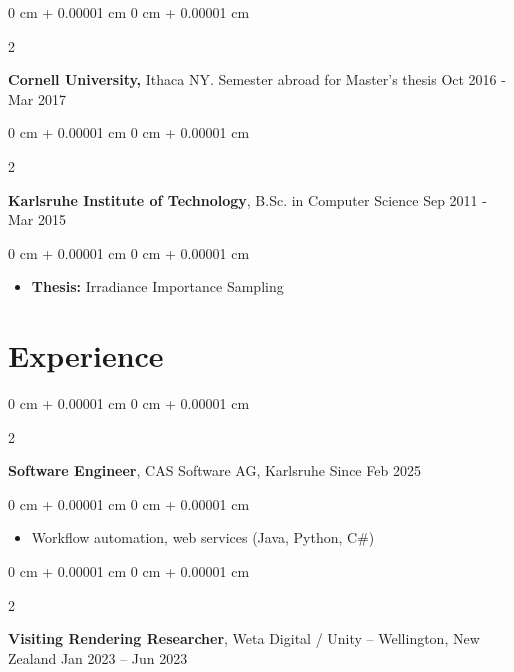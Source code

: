 \documentclass[10pt, letterpaper]{article}
\newenvironment{highlights}{
    \begin{itemize}[
        topsep=0.10 cm,
        parsep=0.10 cm,
        partopsep=0pt,
        itemsep=0pt,
        leftmargin=0 cm + 10pt
    ]
}{
    \end{itemize}
} %
\newenvironment{onecolentry}{
    \begin{adjustwidth}{
        0 cm + 0.00001 cm
    }{
        0 cm + 0.00001 cm
    }
}{
    \end{adjustwidth}
} %
\newenvironment{twocolentry}[2][]{
    \onecolentry
    \def\secondColumn{#2}
    \setcolumnwidth{\fill, 4.5 cm}
    \begin{paracol}{2}
}{
    \switchcolumn \raggedleft \secondColumn
    \end{paracol}
    \endonecolentry
} %
\begin{document}
        \educspace   
        
        \begin{twocolentry}{
            Oct 2016 - Mar 2017
        }
            \textbf{Cornell University,} Ithaca NY. Semester abroad for Master's thesis\end{twocolentry}

        \educspace

        \begin{twocolentry}{
            Sep 2011 - Mar 2015
        }
            \textbf{Karlsruhe Institute of Technology}, B.Sc. in Computer Science\end{twocolentry}

        \vspace{0.10 cm}
        \begin{onecolentry}
            \begin{highlights}
            \item \textbf{Thesis:} Irradiance Importance Sampling
            \end{highlights}
        \end{onecolentry}

    
    \sectionspace
    \section{Experience}
      \sectspacetop

      \begin{twocolentry}{
            Since Feb 2025
        }
            \textbf{Software Engineer}, CAS Software AG, Karlsruhe\end{twocolentry}

        \vspace{0.10 cm}
        \begin{onecolentry}
            \begin{highlights}
                \item Workflow automation, web services (Java, Python, C\#)
            \end{highlights}
        \end{onecolentry}

      \expspace
      
        \begin{twocolentry}{
            Jan 2023 – Jun 2023
        }
            \textbf{Visiting Rendering Researcher}, Weta Digital / Unity -- Wellington, New Zealand\end{twocolentry}
\end{document}
